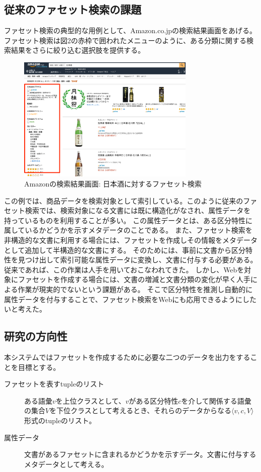 \documentclass[a4j,10pt, twocolumn]{jarticle} \usepackage[dvipdfmx]{graphicx} \usepackage{amssymb} \usepackage{amsmath}
\begin{document}
\subsection{従来のファセット検索の課題}
 ファセット検索の典型的な用例として、Amazon.co.jp\cite{amazon}の検索結果画面をあげる。
 ファセット検索は図2の赤枠で囲われたメニューのように、ある分類に関する検索結果をさらに絞り込む選択肢を提供する。
 \begin{figure}[ht]
   \includegraphics[width=85mm]{./amazon.png}
   \caption{Amazonの検索結果画面: 日本酒に対するファセット検索}
 \end{figure}
 この例では、商品データを検索対象として索引している。このように従来のファセット検索では、検索対象になる文書には既に構造化がなされ、属性データを持っているものを利用することが多い。
 この属性データとは、ある区分特性に属しているかどうかを示すメタデータのことである。
 また、ファセット検索を非構造的な文書に利用する場合には、ファセットを作成しその情報をメタデータとして追加して半構造的な文書にする。
 そのためには、事前に文書から区分特性を見つけ出して索引可能な属性データに変換し、文書に付与する必要がある。
 従来であれば、この作業は人手を用いておこなわれてきた。
 しかし、Webを対象にファセットを作成する場合には、文書の増減と文書分類の変化が早く人手による作業が現実的でないという課題がある。
 そこで区分特性を推測し自動的に属性データを付与することで、ファセット検索をWebにも応用できるようにしたいと考えた。

\subsection{研究の方向性}
本システムではファセットを作成するために必要な二つのデータを出力をすることを目標とする。
\begin{description}
  \item[ファセットを表すtupleのリスト] ある語彙$v$を上位クラスとして、$v$がある区分特性$c$を介して関係する語彙の集合$V$を下位クラスとして考えるとき、それらのデータからなる$\langle v, c, V\rangle$形式のtupleのリスト。
  \item[属性データ] 文書があるファセットに含まれるかどうかを示すデータ。文書に付与するメタデータとして考える。
\end{description}
\end{document}
